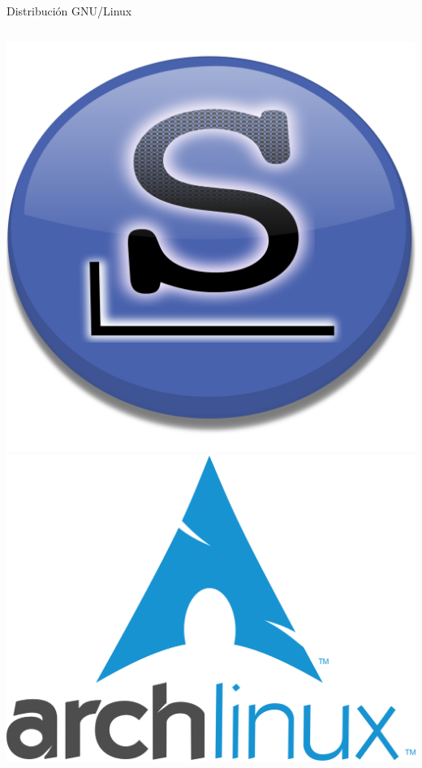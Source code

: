 \documentclass{beamer}
\begin{document}
\begin{frame}{Distribución GNU/Linux}
\begin{columns}[t]
\includegraphics[scale=0.03]{slackware.png}\\
\includegraphics[scale=0.03]{arch.png}
\end{columns}

\end{frame}
\end{document}
